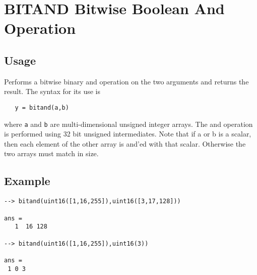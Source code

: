 \section{BITAND Bitwise Boolean And Operation}

\subsection{Usage}

Performs a bitwise binary and operation on the two arguments and
returns the result.  The syntax for its use is
\begin{verbatim}
   y = bitand(a,b)
\end{verbatim}
where \verb|a| and \verb|b| are multi-dimensional unsigned integer arrays.
The and operation is performed using 32 bit unsigned intermediates.  Note that if a
or b is a scalar, then each element of the other array is and'ed with
 that scalar.  Otherwise the two arrays must match in size.
\subsection{Example}

\begin{verbatim}
--> bitand(uint16([1,16,255]),uint16([3,17,128]))

ans = 
   1  16 128 

--> bitand(uint16([1,16,255]),uint16(3))

ans = 
 1 0 3 
\end{verbatim}
